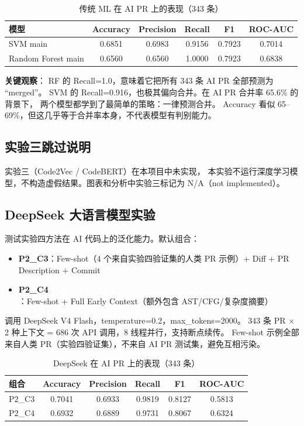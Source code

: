 \documentclass{experimentreport}
\begin{document}
\begin{table}[htbp]
\centering
\caption{传统 ML 在 AI PR 上的表现（343 条）}
\begin{tabular}{lccccc}
\toprule
模型 & Accuracy & Precision & Recall & F1 & ROC-AUC \\
\midrule
SVM main & 0.6851 & 0.6983 & 0.9156 & 0.7923 & 0.7014 \\
Random Forest main & 0.6560 & 0.6560 & 1.0000 & 0.7923 & 0.6838 \\
\bottomrule
\end{tabular}
\end{table}

\textbf{关键观察}：
RF 的 Recall=1.0，意味着它把所有 343 条 AI PR 全部预测为 ``merged''。
SVM 的 Recall=0.916，也极其偏向合并。在 AI PR 合并率 65.6\% 的背景下，
两个模型都学到了最简单的策略：一律预测合并。
Accuracy 看似 65--69\%，但这几乎等于合并率本身，不代表模型有判别能力。

\subsection{实验三跳过说明}

实验三（Code2Vec / CodeBERT）在本项目中未实现，
本实验不运行深度学习模型，不构造虚假结果。图表和分析中实验三标记为 N/A（not implemented）。

\subsection{DeepSeek 大语言模型实验}

测试实验四方法在 AI 代码上的泛化能力。默认组合：

\begin{itemize}
    \item \textbf{P2\_C3}：Few-shot（4 个来自实验四验证集的人类 PR 示例）+ Diff + PR Description + Commit
    \item \textbf{P2\_C4}：Few-shot + Full Early Context（额外包含 AST/CFG/复杂度摘要）
\end{itemize}

调用 DeepSeek V4 Flash，temperature=0.2，max\_tokens=2000。
343 条 PR $\times$ 2 种上下文 = 686 次 API 调用，8 线程并行，支持断点续传。
Few-shot 示例全部来自人类 PR（实验四验证集），不来自 AI PR 测试集，避免互相污染。

\begin{table}[htbp]
\centering
\caption{DeepSeek 在 AI PR 上的表现（343 条）}
\begin{tabular}{lccccc}
\toprule
组合 & Accuracy & Precision & Recall & F1 & ROC-AUC \\
\midrule
P2\_C3 & 0.7041 & 0.6933 & 0.9819 & 0.8127 & 0.5813 \\
P2\_C4 & 0.6932 & 0.6889 & 0.9731 & 0.8067 & 0.6324 \\
\bottomrule
\end{tabular}
\end{table}
\end{document}
